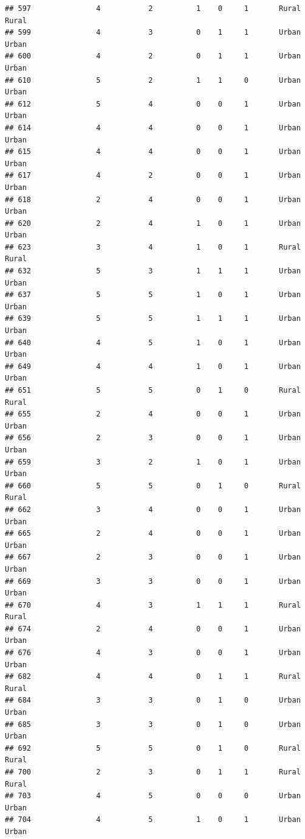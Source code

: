 \documentclass[
]{article}
\begin{document}
\begin{verbatim}
## 597               4           2          1    0     1       Rural Rural
## 599               4           3          0    1     1       Urban Urban
## 600               4           2          0    1     1       Urban Urban
## 610               5           2          1    1     0       Urban Urban
## 612               5           4          0    0     1       Urban Urban
## 614               4           4          0    0     1       Urban Urban
## 615               4           4          0    0     1       Urban Urban
## 617               4           2          0    0     1       Urban Urban
## 618               2           4          0    0     1       Urban Urban
## 620               2           4          1    0     1       Urban Urban
## 623               3           4          1    0     1       Rural Rural
## 632               5           3          1    1     1       Urban Urban
## 637               5           5          1    0     1       Urban Urban
## 639               5           5          1    1     1       Urban Urban
## 640               4           5          1    0     1       Urban Urban
## 649               4           4          1    0     1       Urban Urban
## 651               5           5          0    1     0       Rural Rural
## 655               2           4          0    0     1       Urban Urban
## 656               2           3          0    0     1       Urban Urban
## 659               3           2          1    0     1       Urban Urban
## 660               5           5          0    1     0       Rural Rural
## 662               3           4          0    0     1       Urban Urban
## 665               2           4          0    0     1       Urban Urban
## 667               2           3          0    0     1       Urban Urban
## 669               3           3          0    0     1       Urban Urban
## 670               4           3          1    1     1       Rural Rural
## 674               2           4          0    0     1       Urban Urban
## 676               4           3          0    0     1       Urban Urban
## 682               4           4          0    1     1       Rural Rural
## 684               3           3          0    1     0       Urban Urban
## 685               3           3          0    1     0       Urban Urban
## 692               5           5          0    1     0       Rural Rural
## 700               2           3          0    1     1       Rural Rural
## 703               4           5          0    0     0       Urban Urban
## 704               4           5          1    0     1       Urban Urban

\end{verbatim}
\end{document}
